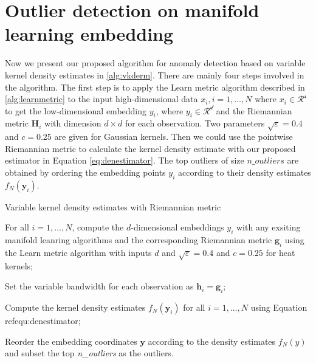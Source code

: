 \documentclass[11pt,a4paper,]{article}
\begin{document}
\hypertarget{outlier-detection-on-manifold-learning-embedding}{%
\section{Outlier detection on manifold learning embedding}\label{outlier-detection-on-manifold-learning-embedding}}

Now we present our proposed algorithm for anomaly detection based on variable kernel density estimates in \ref{alg:vkderm}. There are mainly four steps involved in the algorithm. The first step is to apply the Learn metric algorithm described in \ref{alg:learnmetric} to the input high-dimensional data \(x_i,i=1,\ldots,N\) where \(x_i\in \mathcal{R^s}\) to get the low-dimensional embedding \(y_i\), where \(y_i\in \mathcal{R^d}\) and the Riemannian metric \(\pmb{H}_i\) with dimension \(d\times d\) for each observation. Two parameters \(\sqrt{\varepsilon} = 0.4\) and \(c=0.25\) are given for Gaussian kernels. Then we could use the pointwise Riemannian metric to calculate the kernel density estimate with our proposed estimator in Equation \eqref{eq:denestimator}. The top outliers of size \(n\_outliers\) are obtained by ordering the embedding points \(y_i\) according to their density estimates \(f_N(\pmb{y}_i)\).

\begin{algorithm}[!htb]
  \caption{Variable kernel density estimates with Riemannian metric}
  \label{alg:vkderm}
  \DontPrintSemicolon
  \SetAlgoLined
  \BlankLine
  \begin{algorithmic}[1]

  \STATE For all $i=1,\ldots,N$, compute the $d$-dimensional embeddings $y_i$ with any exsiting manifold leanring algorithms and the corresponding Riemannian metric $\pmb{g}_i$ using the Learn metric algorithm with inputs $d$ and $\sqrt{\varepsilon} = 0.4$ and $c=0.25$ for heat kernels;

  \STATE Set the variable bandwidth for each observation as $\pmb{h}_i = \pmb{g}_i$;

  \STATE Compute the kernel density estimates $f_N(\pmb{y}_i)$ for all $i=1,\ldots,N$ using Equation \\ref{equ:denestimator};

  \STATE Reorder the embedding coordinates $\pmb{y}$ according to the density estimates $f_N(y)$ and subset the top \textit{n\_outliers} as the outliers.

  \end{algorithmic}
\end{algorithm}
\end{document}
